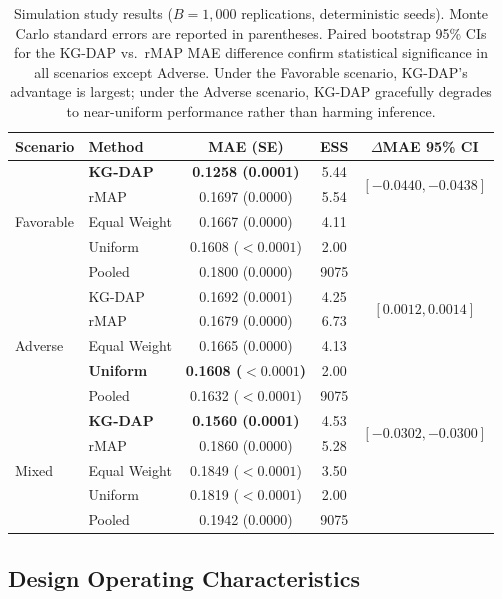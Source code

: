 \documentclass[12pt]{article}
\begin{document}
\begin{table}[t]
\centering
\caption{Simulation study results ($B = 1{,}000$ replications, deterministic seeds). Monte Carlo standard errors are reported in parentheses. Paired bootstrap 95\% CIs for the KG-DAP vs.\ rMAP MAE difference confirm statistical significance in all scenarios except Adverse. Under the Favorable scenario, KG-DAP's advantage is largest; under the Adverse scenario, KG-DAP gracefully degrades to near-uniform performance rather than harming inference.}
\label{tab:simulation}
\begin{tabular}{llccc}
\toprule
Scenario & Method & MAE (SE) & ESS & $\Delta$MAE 95\% CI \\
\midrule
\multirow{5}{*}{Favorable}
& \textbf{KG-DAP} & \textbf{0.1258 (0.0001)} & 5.44 & \multirow{2}{*}{$[-0.0440, -0.0438]$} \\
& rMAP             & 0.1697 (0.0000)           & 5.54 & \\
& Equal Weight     & 0.1667 (0.0000)           & 4.11 & \\
& Uniform          & 0.1608 ($< 0.0001$)       & 2.00 & \\
& Pooled           & 0.1800 (0.0000)           & 9075 & \\
\midrule
\multirow{5}{*}{Adverse}
& KG-DAP           & 0.1692 (0.0001) & 4.25 & \multirow{2}{*}{$[0.0012, 0.0014]$} \\
& rMAP             & 0.1679 (0.0000) & 6.73 & \\
& Equal Weight     & 0.1665 (0.0000) & 4.13 & \\
& \textbf{Uniform} & \textbf{0.1608 ($< 0.0001$)} & 2.00 & \\
& Pooled           & 0.1632 ($< 0.0001$) & 9075 & \\
\midrule
\multirow{5}{*}{Mixed}
& \textbf{KG-DAP} & \textbf{0.1560 (0.0001)} & 4.53 & \multirow{2}{*}{$[-0.0302, -0.0300]$} \\
& rMAP             & 0.1860 (0.0000)           & 5.28 & \\
& Equal Weight     & 0.1849 ($< 0.0001$)      & 3.50 & \\
& Uniform          & 0.1819 ($< 0.0001$)      & 2.00 & \\
& Pooled           & 0.1942 (0.0000)           & 9075 & \\
\bottomrule
\end{tabular}
\end{table}

\subsection{Design Operating Characteristics}
\label{sec:design_oc}
\end{document}
